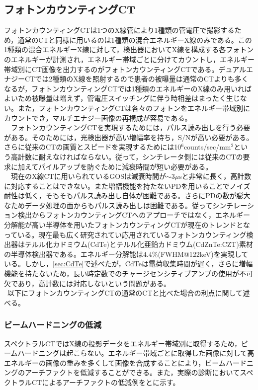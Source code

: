 \subsection{フォトンカウンティングCT\label{sec:CT_photon}}
フォトンカウンティングCTは1つのX線管により1種類の管電圧で撮影するため，通常のCTと同様に用いるのは1種類の混合エネルギーX線のみである。この1種類の混合エネルギーX線に対して，検出器においてX線を構成する各フォトンのエネルギーが計測され，エネルギー帯域ごとに分けてカウントし，エネルギー帯域別にCT画像を出力するのがフォトンカウンティングCTである。デュアルエナジーCTでは2種類のX線を照射するので患者の被曝量は通常のCTよりも多くなるが，フォトンカウンティングCTでは1種類のエネルギーのX線のみ用いればよいため被曝量は増えず，管電圧スイッチングに伴う時相差はまったく生じない。また，フォトンカウンティングCTは各々のフォトンをエネルギー帯域別にカウントでき，マルチエナジー画像の再構成が容易である。\\
\ \ フォトンカウンティングCTを実現するためには，パルス読み出しを行う必要がある。そのためには，光検出器が高い増幅率を持ち，S/Nが高い必要がある。さらに従来のCTの画質とスピードを実現するためには10$^6$counts/sec/mm$^2$という高計数に耐えなければならない。従って，シンチレータ側には従来のCTの要求に加えてパイルアップを防ぐために減衰時間が短い必要がある。\\ 
\ \ 現在のX線CTに用いられているGOSは減衰時間が$\sim$3$\mu$sと非常に長く，高計数に対応することはできない。また増幅機能を持たないPDを用いることでノイズ耐性は低く，そもそもパルス読み出し自体が困難である。さらにPDの数が膨大なためデータ処理の面からもパルス読み出しは困難である。従ってシンチレーション検出からフォトンカウンティングCTへのアプローチではなく，エネルギー分解能が高い半導体を用いたフォトンカウンティングCTが現在のトレンドとなっている。現在最も広く研究されてい応用されているフォトンカウンティング検出器はテルル化カドミウム(CdTe)とテルル化亜鉛カドミウム(CdZnTe:CZT)素材の半導体検出器である\cite{ogawa}\cite{ogawa_id}\cite{kowase}\cite{Adam}\cite{Jan}。エネルギー分解能は$4.4\%$(FWHM@122keV)を実現している\cite{ogawa}。しかし，\ref{sec:CdTe}で述べたが，CdTeは電荷収集時間が遅く，さらに増幅機能を持たないため，長い時定数でのチャージセンシティブアンプの使用が不可欠であり，高計数には対応しないという問題がある。\\\ 以下にフォトンカウンティングCTの通常のCTと比べた場合の利点に関して述べる。

\subsubsection*{ビームハードニングの低減}
スペクトラルCTではX線の投影データをエネルギー帯域別に取得するため，ビームハードニングは起こらない。エネルギー帯域ごとに取得した画像に対して高エネルギーの画像の重みを多くして画像を合成することにより，ビームハードニングのアーチファクトを低減することができる\cite{kowase}。また，実際の診断においてスペクトラルCTによるアーチファクトの低減例\cite{spectralCT}をとに示す。

